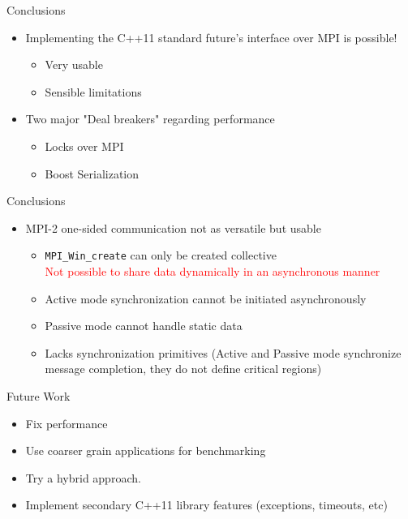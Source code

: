 \documentclass[svgnames]{beamer}
\begin{document}
\begin{frame}{Conclusions}
\begin{itemize}
	\item Implementing the C++11 standard future's interface over MPI is possible!
	\begin{itemize}
		\item Very usable
		\item Sensible limitations
	\end{itemize}
\vfill
	\item Two major "Deal breakers" regarding performance
	\begin{itemize}
		\item Locks over MPI
		\item Boost Serialization
	\end{itemize}
\end{itemize}
\end{frame}
\begin{frame}{Conclusions}
\begin{itemize}
	\item MPI-2 one-sided communication not as versatile but usable
	\begin{itemize}
		\item \texttt{MPI\_Win\_create} can only be created collective\\
					\textcolor{red}{Not possible to share data dynamically in an asynchronous manner}
		\item Active mode synchronization cannot be initiated asynchronously
		\item Passive mode cannot handle static data
		\item Lacks synchronization primitives (Active and Passive mode synchronize message completion, they do not define
					critical regions)
	\end{itemize}
\end{itemize}
\end{frame}

\begin{frame}{Future Work}
\begin{itemize}
	\item Fix performance
	\item Use coarser grain applications for benchmarking
	\item Try a hybrid approach.
	\item Implement secondary C++11 library features (exceptions, timeouts, etc)
\end{itemize}
\end{frame}
\end{document}
